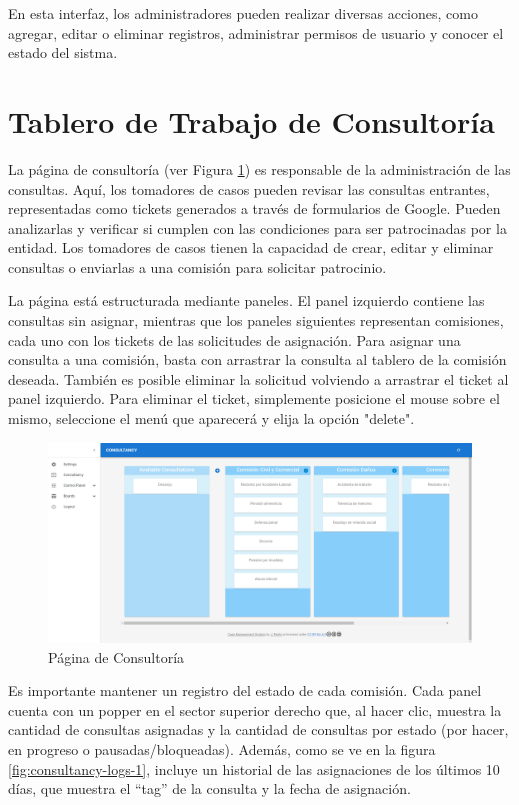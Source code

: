 En esta interfaz, los administradores pueden realizar diversas acciones, como agregar, editar o eliminar registros, administrar permisos de usuario y conocer el estado del sistma.



\section{Tablero de Trabajo de Consultoría}
La página de consultoría (ver Figura \ref{fig:consultancy-real-page}) es responsable de la administración de las consultas. Aquí, los tomadores de casos pueden revisar las consultas entrantes, representadas como tickets generados a través de formularios de Google. Pueden analizarlas y verificar si cumplen con las condiciones para ser patrocinadas por la entidad. Los tomadores de casos tienen la capacidad de crear, editar y eliminar consultas o enviarlas a una comisión para solicitar patrocinio.

La página está estructurada mediante paneles. El panel izquierdo contiene las consultas sin asignar, mientras que los paneles siguientes representan comisiones, cada uno con los tickets de las solicitudes de asignación. Para asignar una consulta a una comisión, basta con arrastrar la consulta al tablero de la comisión deseada. También es posible eliminar la solicitud volviendo a arrastrar el ticket al panel izquierdo. Para eliminar el ticket, simplemente posicione el mouse sobre el mismo, seleccione el menú que aparecerá y elija la opción "delete".

\begin{figure}[H]
    \centering
    \includegraphics[width=1\linewidth]{fig/consultancy-real-page.png}
    \caption{Página de Consultoría}
    \label{fig:consultancy-real-page}
\end{figure}

Es importante mantener un registro del estado de cada comisión. Cada panel cuenta con un popper en el sector superior derecho que, al hacer clic, muestra la cantidad de consultas asignadas y la cantidad de consultas por estado (por hacer, en progreso o pausadas/bloqueadas). Además, como se ve en la figura \ref{fig:consultancy-logs-1}, incluye un historial de las asignaciones de los últimos 10 días, que muestra el ``tag'' de la consulta y la fecha de asignación.

